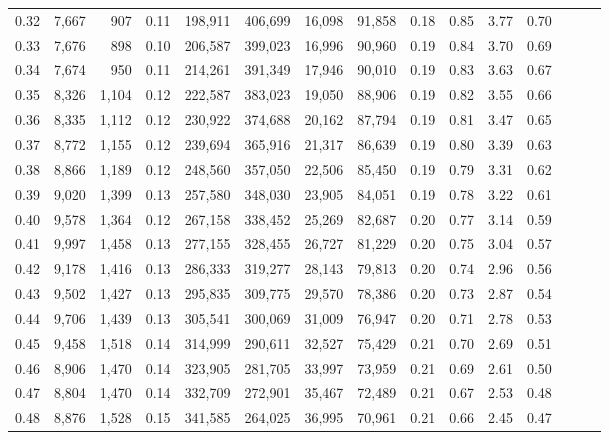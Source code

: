 \begin{tabular}{rrrrrrrrrrrrrrr}
0.32 &   7,667 &    907 &  0.11 &  198,911 &  406,699 &   16,098 &   91,858 &  0.18 &  0.85 &  3.77 &      0.70 \\
0.33 &   7,676 &    898 &  0.10 &  206,587 &  399,023 &   16,996 &   90,960 &  0.19 &  0.84 &  3.70 &      0.69 \\
0.34 &   7,674 &    950 &  0.11 &  214,261 &  391,349 &   17,946 &   90,010 &  0.19 &  0.83 &  3.63 &      0.67 \\
0.35 &   8,326 &  1,104 &  0.12 &  222,587 &  383,023 &   19,050 &   88,906 &  0.19 &  0.82 &  3.55 &      0.66 \\
0.36 &   8,335 &  1,112 &  0.12 &  230,922 &  374,688 &   20,162 &   87,794 &  0.19 &  0.81 &  3.47 &      0.65 \\
0.37 &   8,772 &  1,155 &  0.12 &  239,694 &  365,916 &   21,317 &   86,639 &  0.19 &  0.80 &  3.39 &      0.63 \\
0.38 &   8,866 &  1,189 &  0.12 &  248,560 &  357,050 &   22,506 &   85,450 &  0.19 &  0.79 &  3.31 &      0.62 \\
0.39 &   9,020 &  1,399 &  0.13 &  257,580 &  348,030 &   23,905 &   84,051 &  0.19 &  0.78 &  3.22 &      0.61 \\
0.40 &   9,578 &  1,364 &  0.12 &  267,158 &  338,452 &   25,269 &   82,687 &  0.20 &  0.77 &  3.14 &      0.59 \\
0.41 &   9,997 &  1,458 &  0.13 &  277,155 &  328,455 &   26,727 &   81,229 &  0.20 &  0.75 &  3.04 &      0.57 \\
0.42 &   9,178 &  1,416 &  0.13 &  286,333 &  319,277 &   28,143 &   79,813 &  0.20 &  0.74 &  2.96 &      0.56 \\
0.43 &   9,502 &  1,427 &  0.13 &  295,835 &  309,775 &   29,570 &   78,386 &  0.20 &  0.73 &  2.87 &      0.54 \\
0.44 &   9,706 &  1,439 &  0.13 &  305,541 &  300,069 &   31,009 &   76,947 &  0.20 &  0.71 &  2.78 &      0.53 \\
0.45 &   9,458 &  1,518 &  0.14 &  314,999 &  290,611 &   32,527 &   75,429 &  0.21 &  0.70 &  2.69 &      0.51 \\
0.46 &   8,906 &  1,470 &  0.14 &  323,905 &  281,705 &   33,997 &   73,959 &  0.21 &  0.69 &  2.61 &      0.50 \\
0.47 &   8,804 &  1,470 &  0.14 &  332,709 &  272,901 &   35,467 &   72,489 &  0.21 &  0.67 &  2.53 &      0.48 \\
0.48 &   8,876 &  1,528 &  0.15 &  341,585 &  264,025 &   36,995 &   70,961 &  0.21 &  0.66 &  2.45 &      0.47 \\

\end{tabular}
